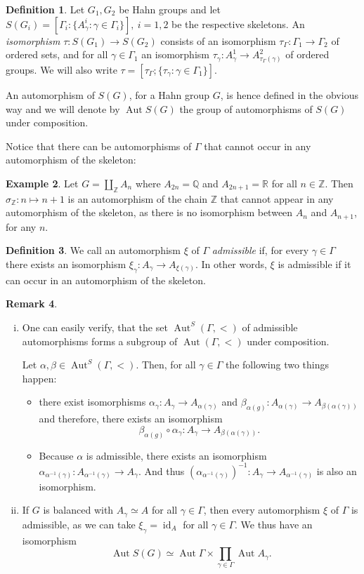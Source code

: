 \documentclass[12pt,a4paper,reqno,openright]{amsart}
\newcommand{\Z}{\mathbb Z}
\newcommand{\Q}{\mathbb Q}
\newcommand{\R}{\mathbb R}
\newcommand{\ra}{\rightarrow}
\renewcommand{\1}{\mathbbm{1}}
\newcommand{\inv}{^{-1}}
\newcommand{\g}{\gamma}
\newcommand{\G}{\Gamma}
\DeclareMathOperator{\id}{id}
\DeclareMathOperator{\Aut}{Aut}
\newcommand{\adAut}{\Aut^S}
\theoremstyle{definition}
\newtheorem{defn}{Definition}[section]
\theoremstyle{plain}
\theoremstyle{plain}
\theoremstyle{plain}
\theoremstyle{plain}
\theoremstyle{plain}
\theoremstyle{plain}
\theoremstyle{plain}
\theoremstyle{plain}
\theoremstyle{definition}
\newtheorem{es}[defn]{Example}
\theoremstyle{definition}
\theoremstyle{plain}
\theoremstyle{definition}
\theoremstyle{definition}
\newtheorem{rmk}[defn]{Remark}
\theoremstyle{plain}
\theoremstyle{plain}
\theoremstyle{plain}
\begin{document}
\begin{defn}
	Let $ G_1,G_2 $ be Hahn groups and let $ S(G_i) = [\Gamma_i:\{ A^i_\gamma : \gamma\in\Gamma_i \}],\ i=1,2 $ be the respective skeletons. An \emph{isomorphism} $ \tau:S(G_1)\ra S(G_2) $ consists of an isomorphism $ \tau_\Gamma:\Gamma_1\ra\Gamma_2 $ of ordered sets, and for all $ \gamma\in\Gamma_1 $ an isomorphism
	$ \tau_\gamma\colon A^1_\gamma\ra A^2_{\tau_\Gamma(\gamma)} $
	of ordered groups. We will also write
	$ \tau = [\tau_\Gamma;\{\tau_\gamma:\gamma\in\Gamma_1\}]. $\\
\end{defn}
An automorphism of $ S(G) $, for a Hahn group $G$, is hence defined in the obvious way and we will denote by $ \Aut S(G) $ the group of automorphisms of $ S(G) $ under composition.

Notice that there can be automorphisms of $\Gamma$ that cannot occur in any automorphism of the skeleton:
\begin{es}
	Let $ G = \coprod_\Z A_n $ where $ A_{2n} = \Q $ and $ A_{2n+1} = \R $ for all $ n\in\Z $. Then $\sigma_\Z\colon n\mapsto n+1 $ is an automorphism of the chain $ \Z $ that cannot appear in any automorphism of the skeleton, as there is no isomorphism between $ A_n $ and $ A_{n+1} $, for any $ n $.
\end{es}

\begin{defn}
	We call an automorphism $\xi$ of $\Gamma$ \emph{admissible} if, for every $\g\in\G$ there exists an isomorphism $\xi_\g\colon A_\g\to A_{\xi(\g)}$. In other words, $\xi$ is admissible if it can occur in an automorphism of the skeleton.
\end{defn}

\begin{rmk}
	\begin{enumerate}[(i)]
		\item One can easily verify, that the set $\adAut(\G,<)$ of admissible automorphisms forms a subgroup of $\Aut(\G,<)$ under composition.
		
		Let $\alpha,\beta\in\adAut(\G,<)$.
		Then, for all $\g\in\G $ the following two things happen:
		\begin{itemize}
			\item there exist isomorphisms $\alpha_\g\colon A_\g \to A_{\alpha(\g)}$ and $\beta_{\alpha(g)}\colon A_{\alpha(\g)} \to A_{\beta(\alpha(\g))}$ and therefore, there exists an isomorphism
		$$\beta_{\alpha(g)}\circ\alpha_\g \colon A_\g 
		\to A_{\beta(\alpha(\g))}.$$
		\item Because $\alpha$ is admissible, there exists an isomorphism $\alpha_{\alpha\inv(\g)} \colon A_{\alpha\inv(\g)} \to A_\g$. 
		And thus $(\alpha_{\alpha\inv(\g)})\inv \colon A_\g \to A_{\alpha\inv(\g)} $ is also an isomorphism.
		\end{itemize}
	\item If $G$ is balanced with $A_\g\simeq A$ for all $\g\in\G$, then every automorphism $\xi$ of $\Gamma$ is admissible, as we can take $\xi_\g=\id_A$ for all $\g\in\G$.
	We thus have an isomorphism
	\[
	\Aut S(G) \simeq \Aut \G \times \prod_{\g\in\G}\Aut A_\g.
	\]
	\end{enumerate}
\end{rmk}
\end{document}

